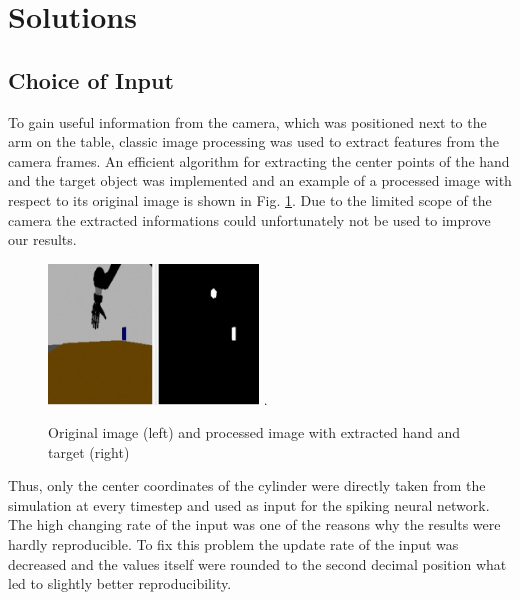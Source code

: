 \section{Solutions}
\subsection{Choice of Input}
To gain useful information from the camera, which was positioned next to the arm on the table, classic image processing was used to extract features from the camera frames. An efficient algorithm for extracting the center points of the hand and the target object was implemented and an example of a processed image with respect to its original image is shown in Fig. \ref{fig:processed_pic}. Due to the limited scope of the camera the extracted informations could unfortunately not be used to improve our results.\\


\begin{figure}[H]
	\centering
	\includegraphics[width=2.2in]{img/image_processing.png}
	\DeclareGraphicsExtensions.
	\caption{Original image (left) and processed image with extracted hand and target (right)}
	\label{fig:processed_pic}
\end{figure}
Thus, only the center coordinates of the cylinder were directly taken from the simulation at every timestep and used as input for the spiking neural network.
The high changing rate of the input was one of the reasons why the results were hardly reproducible. 
To fix this problem the update rate of the input was decreased and the values itself were rounded to the second decimal position what led to slightly better reproducibility. 

